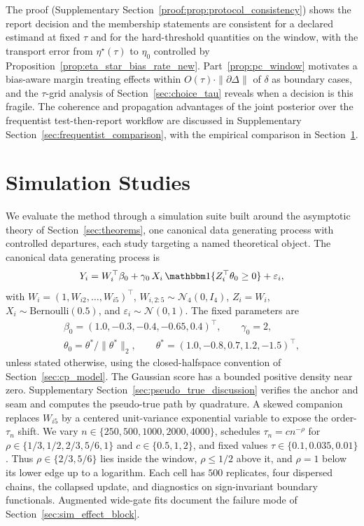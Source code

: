\documentclass[11pt]{article}
\theoremstyle{definition}
\theoremstyle{plain}
\begin{document}
The proof (Supplementary Section~\ref{proof:prop:protocol_consistency}) shows the report decision and the membership statements are consistent for a declared estimand at fixed $\tau$ and for the hard-threshold quantities on the window, with the transport error from $\eta^\star(\tau)$ to $\eta_0$ controlled by Proposition~\ref{prop:eta_star_bias_rate_new}. Part~\ref{prop:pc_window} motivates a bias-aware margin treating effects within $O(\tau)\cdot\|\partial\Delta\|$ of $\delta$ as boundary cases, and the $\tau$-grid analysis of Section~\ref{sec:choice_tau} reveals when a decision is this fragile. The coherence and propagation advantages of the joint posterior over the frequentist test-then-report workflow are discussed in Supplementary Section~\ref{sec:frequentist_comparison}, with the empirical comparison in Section~\ref{sec:simulations}.
\section{Simulation Studies}
\label{sec:simulations}

We evaluate the method through a simulation suite built around the asymptotic theory of Section~\ref{sec:theorems}, one canonical data generating process with controlled departures, each study targeting a named theoretical object.
The canonical data generating process is
\begin{equation}
Y_i = W_i^\top\beta_0 + \gamma_0\,X_i\,\mathbbm 1\{Z_i^\top\theta_0\ge0\} + \varepsilon_i,
\label{eq:sim_dgp}
\end{equation}
with $W_i=(1,W_{i2},\ldots,W_{i5})^\top$, $W_{i,2:5}\sim\mathcal N_4(0,I_4)$, $Z_i=W_i$, $X_i\sim\mathrm{Bernoulli}(0.5)$, and $\varepsilon_i\sim\mathcal N(0,1)$. The fixed parameters are
\[
\begin{gathered}
\beta_0=(1.0,-0.3,-0.4,-0.65,0.4)^\top,\qquad \gamma_0=2,\\
\theta_0=\theta^*/\|\theta^*\|_2,\qquad \theta^*=(1.0,-0.8,0.7,1.2,-1.5)^\top,
\end{gathered}
\]
unless stated otherwise, using the closed-halfspace convention of Section~\ref{sec:cp_model}. The Gaussian score has a bounded positive density near zero. Supplementary Section~\ref{sec:pseudo_true_discussion} verifies the anchor and seam and computes the pseudo-true path by quadrature. A skewed companion replaces $W_{i5}$ by a centered unit-variance exponential variable to expose the order-$\tau_n$ shift. We vary $n\in\{250,500,1000,2000,4000\}$, schedules $\tau_n=cn^{-\rho}$ for $\rho\in\{1/3,1/2,2/3,5/6,1\}$ and $c\in\{0.5,1,2\}$, and fixed values $\tau\in\{0.1,0.035,0.01\}$. Thus $\rho\in\{2/3,5/6\}$ lies inside the window, $\rho\le1/2$ above it, and $\rho=1$ below its lower edge up to a logarithm. Each cell has $500$ replicates, four dispersed chains, the collapsed update, and diagnostics on sign-invariant boundary functionals. Augmented wide-gate fits document the failure mode of Section~\ref{sec:sim_effect_block}.
\end{document}
